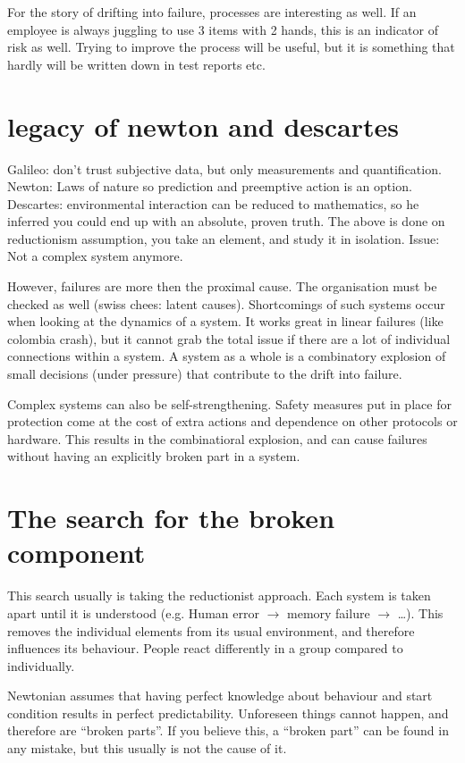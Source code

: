 For the story of drifting into failure, processes are interesting as well. 
If an employee is always juggling to use 3 items with 2 hands, this is an indicator of risk as well.
Trying to improve the process will be useful, but it is something that hardly will be written down in test reports etc.

\section{legacy of newton and descartes}
Galileo: don't trust subjective data, but only measurements and quantification.
Newton: Laws of nature so prediction and preemptive action is an option.
Descartes: environmental interaction can be reduced to mathematics, so he inferred you could end up with an absolute, proven truth.
The above is done on reductionism assumption, you take an element, and study it in isolation. 
Issue: Not a complex system anymore.

However, failures are more then the proximal cause. 
The organisation must be checked as well (swiss chees: latent causes).
Shortcomings of such systems occur when looking at the dynamics of a system. 
It works great in linear failures (like colombia crash), but it cannot grab the total issue if there are a lot of individual connections within a system. 
A system as a whole is a combinatory explosion of small decisions (under pressure) that contribute to the drift into failure.

Complex systems can also be self-strengthening.
Safety measures put in place for protection come at the cost of extra actions and dependence on other protocols or hardware. 
This results in the combinatioral explosion, and can cause failures without having an explicitly broken part in a system.

\section{The search for the broken component}
This search usually is taking the reductionist approach.
Each system is taken apart until it is understood (e.g. Human error $\rightarrow$ memory failure $\rightarrow$ \ldots).
This removes the individual elements from its usual environment, and therefore influences its behaviour. 
People react differently in a group compared to individually.

Newtonian assumes that having perfect knowledge about behaviour and start condition results in perfect predictability. 
Unforeseen things cannot happen, and therefore are ``broken parts''. 
If you believe this, a ``broken part'' can be found in any mistake, but this usually is not the cause of it.

